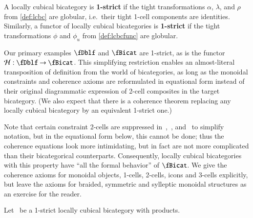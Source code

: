 \begin{defn}\label{defn:1strict}
  A locally cubical bicategory is \textbf{1-strict} if the tight transformations $\alpha$, $\lambda$, and $\rho$ from \cref{def:lcbc} are globular, i.e.\ their tight 1-cell components are identities.
  Similarly, a functor of locally cubical bicategories is \textbf{1-strict} if the tight transformations $\phi$ and $\phi_u$ from \cref{def:lcbcfunc} are globular.
\end{defn}

Our primary examples $\fDblf$ and $\fBicat$ are 1-strict, as is the functor $\cH:\fDblf\to\fBicat$.
This simplifying restriction enables an almost-literal transposition of definition from the world of bicategories, as long as the monoidal constraints and coherence axioms are reformulated in equational form instead of their original diagrammatic expression of 2-cell composites in the target bicategory.
(We also expect that there is a coherence theorem replacing any locally cubical bicategory by an equivalent 1-strict one.)

Note that certain constraint 2-cells are suppressed in~\cite{nick:tricatsbook},~\cite{mccrudden:bal-coalgb}, and~\cite{gg:ldstr-tricat} to simplify notation, but in the equational form below, this cannot be done; thus the coherence equations look more intimidating, but in fact are not more complicated than their bicategorical counterparts. Consequently, locally cubical bicategories with this property have ``all the formal behavior'' of $\fBicat$.
We give the coherence axioms for monoidal objects, 1-cells, 2-cells, icons and 3-cells explicitly, but leave the axioms for braided, symmetric and sylleptic monoidal structures as an exercise for the reader.


Let \fB\ be a 1-strict locally cubical bicategory with products.

